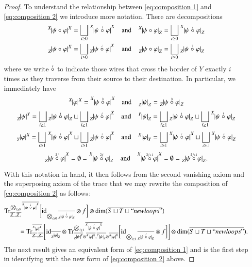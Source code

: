 \documentclass{amsart}
\def\tn{\textnormal}
\def\dim{\tn{dim}}
\def\Trace{\tn{Tr}}
\def\hsp{\hspace{.3in}}
\def\ol{\overline}
\def\id{\tn{id}}
\newcommand{\feeddd}[3]{{\tensor*[^{#2}_{\color{white}{!}}]{{|#1|}}{^{#3}}}}%
\newcommand{\feeddc}[3]{{\tensor*[^{#2}]{{|#1|}}{_{#3}}}}
\newcommand{\feedcd}[3]{{\tensor*[_{#2}]{{|#1|}}{^{#3}}}}
\newcommand{\feedcc}[3]{{\tensor*[^{\color{white}{!}}_{#2}]{{|#1|}}{_{#3}}}}
\theoremstyle{remark}
\theoremstyle{definition}
\begin{document}
\begin{proof}
To understand the relationship between \eqref{eq:composition 1} and \eqref{eq:composition 2} we introduce more notation.  There are decompositions
\begin{align*}
 \feeddd{\psi\circ\varphi}{X}{X}&=\bigsqcup_{i\ge0}\feeddd{\psi\;\accentset{i}{\circ}\;\varphi}{X}{X}&\text{and}&&\feeddc{\psi\circ\varphi}{X}{Z}&=\bigsqcup_{i\ge0}\feeddc{\psi\;\accentset{i}{\circ}\;\varphi}{X}{Z}\\
 \feedcd{\psi\circ\varphi}{Z}{X}&=\bigsqcup_{i\ge0}\feedcd{\psi\;\accentset{i}{\circ}\;\varphi}{Z}{X}&\text{and}&&\feedcc{\psi\circ\varphi}{Z}{Z}&=\bigsqcup_{i\ge0}\feedcc{\psi\;\accentset{i}{\circ}\;\varphi}{Z}{Z}
\end{align*}
where we write $\accentset{i}{\circ}$ to indicate those wires that cross the border of $Y$ exactly $i$ times as they traverse from their source to their destination.  In particular, we immediately have
\[\feeddd{\varphi}{X}{X}=\feeddd{\psi\;\accentset{0}{\circ}\;\varphi}{X}{X}\quad\text{and}\quad\feedcc{\psi}{Z}{Z}=\feedcc{\psi\;\accentset{0}{\circ}\;\varphi}{Z}{Z}\]
\[\feedcd{\psi}{Z}{Y}=\bigsqcup_{i\ge1}\feedcc{\psi\;\accentset{i}{\circ}\;\varphi}{Z}{Z}\sqcup\bigsqcup_{i\ge1}\feedcd{\psi\;\accentset{i}{\circ}\;\varphi}{Z}{X}\quad\text{and}\quad\feeddc{\psi}{Y}{Z}=\bigsqcup_{i\ge1}\feedcc{\psi\;\accentset{i}{\circ}\;\varphi}{Z}{Z}\sqcup\bigsqcup_{i\ge1}\feeddc{\psi\;\accentset{i}{\circ}\;\varphi}{X}{Z}\]
\[\feedcd{\varphi}{Y}{X}=\bigsqcup_{i\ge1}\feeddd{\psi\;\accentset{i}{\circ}\;\varphi}{X}{X}\sqcup\bigsqcup_{i\ge1}\feedcd{\psi\;\accentset{i}{\circ}\;\varphi}{Z}{X}\quad\text{and}\quad\feeddc{\varphi}{X}{Y}=\bigsqcup_{i\ge1}\feeddd{\psi\;\accentset{i}{\circ}\;\varphi}{X}{X}\sqcup\bigsqcup_{i\ge1}\feeddc{\psi\;\accentset{i}{\circ}\;\varphi}{X}{Z}\]
\[\feedcd{\psi\;\accentset{2j}{\circ}\;\varphi}{Z}{X}=\emptyset=\feeddc{\psi\;\accentset{2j}{\circ}\;\varphi}{X}{Z}\quad\text{and}\quad\feeddd{\psi\;\accentset{2j+1}{\circ}\;\varphi}{X}{X}=\emptyset=\feedcc{\psi\;\accentset{2j+1}{\circ}\;\varphi}{Z}{Z}.\]

With this notation in hand, it then follows from the second vanishing axiom and the superposing axiom of the trace that we may rewrite the composition of \eqref{eq:composition 2} as follows:
\begin{align*}
 &\Trace^{\bigotimes_{i\ge0}\ol{\feeddd{\psi\;\accentset{i}{\circ}\;\varphi}{X}{X}}}_{\ol{Z_-},\ol{Z_+}}\bigg[\id_{\bigotimes_{i\ge0}\ol{\feedcc{\psi\;\accentset{i}{\circ}\;\varphi}{Z}{Z}}}\otimes f\bigg]\otimes\dim(\ol{S\sqcup T\sqcup ``newloops"})\\
 &\hsp=\Trace^{\ol{\feeddd{\varphi}{X}{X}}}_{\ol{Z_-},\ol{Z_+}}\Bigg[
 \id_{\ol{\feedcc{\psi}{Z}{Z}}}\otimes\Trace^{\bigotimes_{i\ge1}\ol{\feeddd{\psi\;\accentset{i}{\circ}\;\varphi}{X}{X}}}_{\ol{\feedcd{\psi}{Z}{Y}}\otimes\ol{\feeddd{\varphi}{X}{X}},\ol{\feeddc{\psi}{Y}{Z}}\otimes\ol{\feeddd{\varphi}{X}{X}}}\bigg[\id_{\bigotimes_{i\ge1}\ol{\feedcc{\psi\;\accentset{i}{\circ}\;\varphi}{Z}{Z}}}\otimes f\bigg]
 \Bigg]\otimes\dim(\ol{S\sqcup T\sqcup ``newloops"}).
\end{align*}
The next result gives an equivalent form of \eqref{eq:composition 1} and is the first step in identifying with the new form of \eqref{eq:composition 2} above.


\end{proof}
\end{document}

